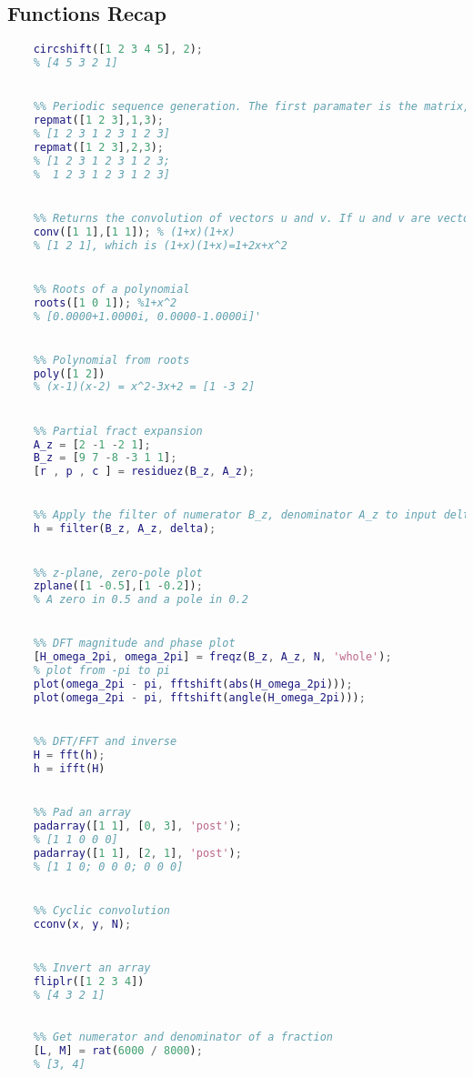 \pagebreak\subsection{Functions Recap}
\begin{lstlisting}[language=Matlab, escapeinside=`']
    %% Shifting discrete signals, a positive value will shift to the right. Circular, if shifting right by n, first n values will become the last n values
    circshift([1 2 3 4 5], 2);
    % [4 5 3 2 1]


    %% Periodic sequence generation. The first paramater is the matrix, the second one is the rows repetition, the third is the cols repetition
    repmat([1 2 3],1,3);
    % [1 2 3 1 2 3 1 2 3]
    repmat([1 2 3],2,3);
    % [1 2 3 1 2 3 1 2 3;
    %  1 2 3 1 2 3 1 2 3] 


    %% Returns the convolution of vectors u and v. If u and v are vectors of polynomial coefficients, convolving them is equivalent to multiplying the two polynomials.
    conv([1 1],[1 1]); % (1+x)(1+x)
    % [1 2 1], which is (1+x)(1+x)=1+2x+x^2


    %% Roots of a polynomial
    roots([1 0 1]); %1+x^2
    % [0.0000+1.0000i, 0.0000-1.0000i]'


    %% Polynomial from roots
    poly([1 2])
    % (x-1)(x-2) = x^2-3x+2 = [1 -3 2]


    %% Partial fract expansion
    A_z = [2 -1 -2 1];
    B_z = [9 7 -8 -3 1 1];
    [r , p , c ] = residuez(B_z, A_z);


    %% Apply the filter of numerator B_z, denominator A_z to input delta
    h = filter(B_z, A_z, delta);


    %% z-plane, zero-pole plot
    zplane([1 -0.5],[1 -0.2]);
    % A zero in 0.5 and a pole in 0.2


    %% DFT magnitude and phase plot
    [H_omega_2pi, omega_2pi] = freqz(B_z, A_z, N, 'whole');
    % plot from -pi to pi
    plot(omega_2pi - pi, fftshift(abs(H_omega_2pi)));
    plot(omega_2pi - pi, fftshift(angle(H_omega_2pi)));


    %% DFT/FFT and inverse
    H = fft(h);
    h = ifft(H)


    %% Pad an array
    padarray([1 1], [0, 3], 'post');
    % [1 1 0 0 0]
    padarray([1 1], [2, 1], 'post');
    % [1 1 0; 0 0 0; 0 0 0]


    %% Cyclic convolution
    cconv(x, y, N);


    %% Invert an array
    fliplr([1 2 3 4])
    % [4 3 2 1]

    
    %% Get numerator and denominator of a fraction
    [L, M] = rat(6000 / 8000); 
    % [3, 4]
\end{lstlisting}

